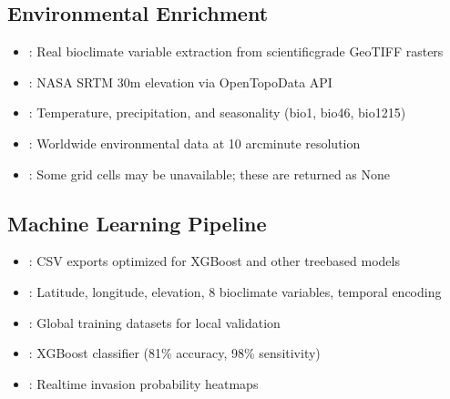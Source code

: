 \documentclass[letterpaper,10pt,english]{sphinxmanual}
\begin{document}
\subsection{Environmental Enrichment}
\label{\detokenize{overview:environmental-enrichment}}\begin{itemize}
\item {} 
\sphinxAtStartPar
{}: Real bioclimate variable extraction from scientific\sphinxhyphen{}grade GeoTIFF rasters

\item {} 
\sphinxAtStartPar
{}: NASA SRTM 30m elevation via Open\sphinxhyphen{}Topo\sphinxhyphen{}Data API

\item {} 
\sphinxAtStartPar
{}: Temperature, precipitation, and seasonality (bio1, bio4\sphinxhyphen{}6, bio12\sphinxhyphen{}15)

\item {} 
\sphinxAtStartPar
{}: Worldwide environmental data at 10 arcminute resolution

\item {} 
\sphinxAtStartPar
{}: Some grid cells may be unavailable; these are returned as None

\end{itemize}


\subsection{Machine Learning Pipeline}
\label{\detokenize{overview:machine-learning-pipeline}}\begin{itemize}
\item {} 
\sphinxAtStartPar
{}: CSV exports optimized for XGBoost and other tree\sphinxhyphen{}based models

\item {} 
\sphinxAtStartPar
{}: Latitude, longitude, elevation, 8 bioclimate variables, temporal encoding

\item {} 
\sphinxAtStartPar
{}: Global training datasets for local validation

\item {} 
\sphinxAtStartPar
{}: XGBoost classifier (81\% accuracy, 98\% sensitivity)

\item {} 
\sphinxAtStartPar
{}: Real\sphinxhyphen{}time invasion probability heatmaps

\end{itemize}
\end{document}
